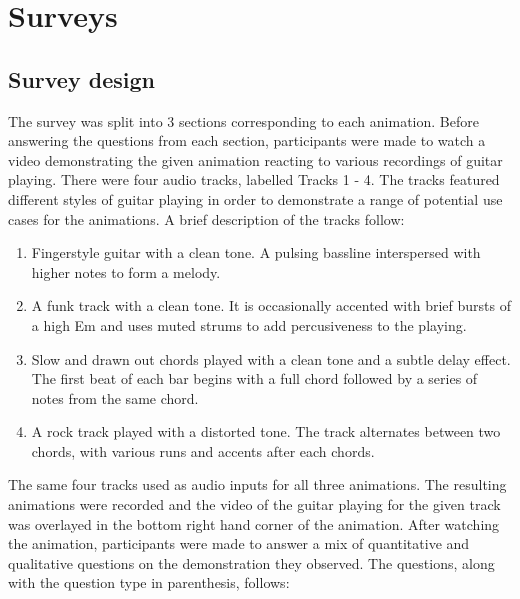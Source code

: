 \documentclass[../initial_thesis.tex]{subfiles}
\begin{document}
\section{Surveys}

\subsection{Survey design}
The survey was split into 3 sections corresponding to each animation. Before answering the questions from each section, participants were made to watch a video demonstrating the given animation reacting to various recordings of guitar playing. There were four audio tracks, labelled Tracks 1 - 4. The tracks featured different styles of guitar playing in order to demonstrate a range of potential use cases for the animations. A brief description of the tracks follow:

\begin{enumerate}
\item {Fingerstyle guitar with a clean tone. A pulsing bassline interspersed with higher notes to form a melody.} %
\item {A funk track with a clean tone. It is occasionally accented with brief bursts of a high Em and uses muted strums to add percusiveness to the playing.}
\item {Slow and drawn out chords played with a clean tone and a subtle delay effect. The first beat of each bar begins with a full chord followed by a series of notes from the same chord.}
\item {A rock track played with a distorted tone. The track alternates between two chords, with various runs and accents after each chords.}
\end{enumerate}

The same four tracks used as audio inputs for all three animations. The resulting animations were recorded and the video of the guitar playing for the given track was overlayed in the bottom right hand corner of the animation. After watching the animation, participants were made to answer a mix of quantitative and qualitative questions on the demonstration they observed. The questions, along with the question type in parenthesis, follows:
\end{document}
